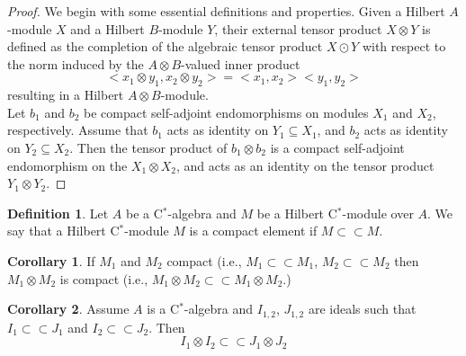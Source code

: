\documentclass{iopconfser}
\theoremstyle{definition}
\newtheorem{definition}{Definition}[section]
\newtheorem{corollary}{Corollary}[theorem]
\begin{document}
\begin{proof} We begin with some essential definitions and properties.
Given a Hilbert $A$-module $X$ and a Hilbert $B$-module $Y$, their external tensor product $X\otimes Y$ is defined as the completion of the algebraic tensor product $X \odot Y $ with respect to the norm induced by the $A\otimes B$-valued inner product
$$<x_1 \otimes y_1, x_2 \otimes y_2>=<x_1,x_2><y_1,y_2> $$ resulting in a Hilbert $A \otimes B$-module.\\

 Let $b_1$ and $b_2$ be compact self-adjoint endomorphisms on modules $X_1$ and $X_2$, respectively. Assume that $b_1$ acts as identity on  $Y_1 \subseteq X_1$, and $b_2$ acts as identity on $Y_2 \subseteq X_2$. Then the tensor product of $b_1 \otimes b_2$ is a compact self-adjoint endomorphism on the $X_1 \otimes X_2$, and acts as an identity on the tensor product $Y_1 \otimes Y_2$. 
\end{proof}

\begin{definition}
   Let $A$ be a C$^*$-algebra and $M$ be a Hilbert C$^*$-module over $A$. We say that a Hilbert C$^*$-module $M$ is a compact element if $M  \subset \subset  M$.
\end{definition}
 \begin{corollary}
 If $M_1$ and $M_2$ compact (i.e., $M_1 \subset \subset M_1$, $M_2  \subset \subset M_2$ then $M_1 \otimes M_2$ is compact (i.e., $M_1 \otimes M_2  \subset \subset M_1 \otimes M_2$.)   
 \end{corollary}

 
\begin{corollary}
 Assume $A$ is a C$^*$-algebra and $I_{1,2}$, $J_{1,2}$ are ideals such that $I_1 \subset \subset J_1$ and  $I_2 \subset \subset J_2$. Then $$I_1 \otimes I_2 \subset \subset J_1 \otimes J_2$$
\end{corollary}
\end{document}
